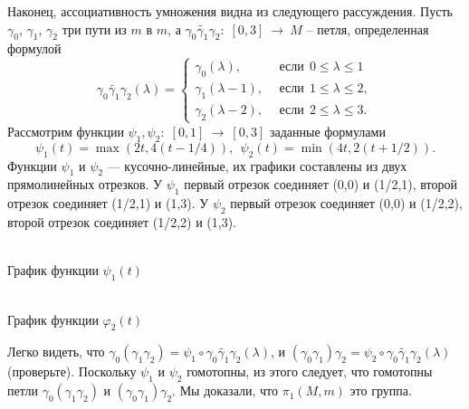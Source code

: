 \documentclass[12pt]{book}
\newcommand{\arrow}{{\:\longrightarrow\:}}
\def\endproof{\hbox{\vrule width 5pt height 5pt depth 0pt}}
\renewcommand{\phi}{\varphi}
\theoremstyle{upshape}
\theoremstyle{generic}
\theoremstyle{upshapenonumber}
\newcommand{\следствие}{%
     \refstepcounter{teorema}
     {\noindent\bf Следствие \thechapter.\arabic{teorema}:\ }}
\newcommand{\пример}{%
     \refstepcounter{teorema}
     {\noindent\bf Пример \thechapter.\arabic{teorema}:\ }}
\newcommand{\лемма}{%
     \refstepcounter{teorema}
     {\noindent\bf Лемма \thechapter.\arabic{teorema}:\ }}
\newcommand{\теорема}{%
     \refstepcounter{teorema}
     {\noindent\bf Теорема \thechapter.\arabic{teorema}:\ }}
\newcommand{\утверждение}{%
     \refstepcounter{teorema}
     {\noindent\bf Утверждение \thechapter.\arabic{teorema}:\ }}
\begin{document}
Наконец, ассоциативность умножения видна из следующего
рассуждения. Пусть $\gamma_0$, $\gamma_1$, $\gamma_2$ три
пути из $m$ в $m$, а $\widetilde{\gamma_0\gamma_1\gamma_2}:\; [0,3]\arrow M$ --
петля, определенная формулой
\[
\widetilde{\gamma_0\gamma_1\gamma_2}(\lambda) = \begin{cases} 
\gamma_0(\lambda), & \ \ \text{если} \ \ 0\leq\lambda\leq 1\\
\gamma_1(\lambda-1), &\ \ \text{если} \ \ 1\leq\lambda\leq 2,\\
\gamma_2(\lambda-2), &\ \ \text{если} \ \ 2\leq\lambda\leq 3.
\end{cases}
\]
Рассмотрим функции $\psi_1, \psi_2:\; [0,1]\arrow [0,3]$
заданные формулами
\[
\psi_1(t) = \max\left(2 t, 4 \left(t-1/4\right)\right), 
\ \ \psi_2(t) = \min\left(4 t, 2\left(t+1/2 \right)\right).
\]
Функции $\psi_1$ и $\psi_2$ --- кусочно-линейные,
их графики составлены из двух прямолинейных отрезков. У $\psi_1$ 
первый отрезок соединяет (0,0) и (1/2,1), второй отрезок
соединяет (1/2,1) и (1,3). У $\psi_2$ первый отрезок 
соединяет (0,0) и (1/2,2), второй отрезок соединяет
 (1/2,2) и (1,3).



\begin{center}
\begin{minipage}{.45\linewidth}
\begin{center}\\ 
{\small График функции $\psi_1(t)$} \end{center}\end{minipage}
\begin{minipage}{.45\linewidth}
\begin{center}\\ 
{\small График функции $\phi_2(t)$} \end{center}\end{minipage}
\end{center}

Легко видеть, что 
$\gamma_0(\gamma_1\gamma_2)=
\psi_1\circ
\widetilde{\gamma_0\gamma_1\gamma_2}(\lambda)$,
и $(\gamma_0\gamma_1)\gamma_2=
\psi_2\circ
\widetilde{\gamma_0\gamma_1\gamma_2}(\lambda)$
(проверьте). Поскольку $\psi_1$ и $\psi_2$ гомотопны,
из этого следует, что гомотопны петли
$\gamma_0(\gamma_1\gamma_2)$ и
$(\gamma_0\gamma_1)\gamma_2$.
Мы доказали, что $\pi_1(M, m)$ это группа.
\endproof
\end{document}
